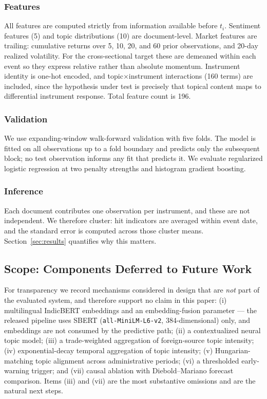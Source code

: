 \documentclass[11pt]{article}
\begin{document}
\subsubsection{Features}
All features are computed strictly from information available before $t_i$. Sentiment features (5) and topic distributions (10) are document-level. Market features are trailing: cumulative returns over 5, 10, 20, and 60 prior observations, and 20-day realized volatility. For the cross-sectional target these are demeaned within each event so they express relative rather than absolute momentum. Instrument identity is one-hot encoded, and topic$\times$instrument interactions (160 terms) are included, since the hypothesis under test is precisely that topical content maps to differential instrument response. Total feature count is 196.

\subsubsection{Validation}
We use expanding-window walk-forward validation with five folds. The model is fitted on all observations up to a fold boundary and predicts only the subsequent block; no test observation informs any fit that predicts it. We evaluate regularized logistic regression at two penalty strengths and histogram gradient boosting.

\subsubsection{Inference}
Each document contributes one observation per instrument, and these are not independent. We therefore cluster: hit indicators are averaged within event date, and the standard error is computed across those cluster means. Section~\ref{sec:results} quantifies why this matters.

\subsection{Scope: Components Deferred to Future Work}
\label{sec:scope}
For transparency we record mechanisms considered in design that are \textit{not} part of the evaluated system, and therefore support no claim in this paper: (i) multilingual IndicBERT embeddings and an embedding-fusion parameter --- the released pipeline uses SBERT (\texttt{all-MiniLM-L6-v2}, 384-dimensional) only, and embeddings are not consumed by the predictive path; (ii) a contextualized neural topic model; (iii) a trade-weighted aggregation of foreign-source topic intensity; (iv) exponential-decay temporal aggregation of topic intensity; (v) Hungarian-matching topic alignment across administrative periods; (vi) a thresholded early-warning trigger; and (vii) causal ablation with Diebold--Mariano \cite{diebold1995} forecast comparison. Items (iii) and (vii) are the most substantive omissions and are the natural next steps.
\end{document}
